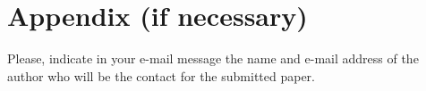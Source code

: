 \newpage
\section*{Appendix (if necessary)} 
Please, indicate in your e-mail message the name and e-mail address of the author who will be the contact for the submitted paper. 
